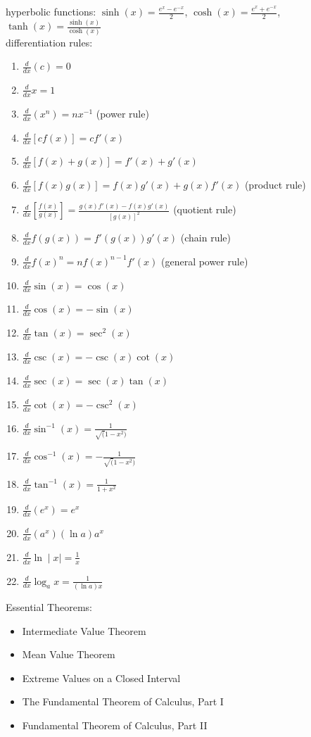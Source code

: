 \documentclass{article}
\begin{document}
hyperbolic functions: $\sinh(x) = \frac{e^x-e^{-x}}{2}$, $\cosh(x) = \frac{e^x+e^{-x}}{2}$, $\tanh(x) = \frac{\sinh(x)}{\cosh(x)}$\\

differentiation rules:
	\begin{enumerate}
		\item$\frac{d}{dx}(c) = 0$
		\item$\frac{d}{dx}x = 1$
		\item$\frac{d}{dx}(x^n) = nx^{-1}$ (power rule)
		\item$\frac{d}{dx}[cf(x)] = cf'(x)$
		\item$\frac{d}{dx}[f(x)+g(x)] = f'(x) + g'(x)$
		\item$\frac{d}{dx}[f(x)g(x)] = f(x)g'(x) + g(x)f'(x)$ (product rule)
		\item$\frac{d}{dx}[\frac{f(x)}{g(x)}] = \frac{g(x)f'(x) - f(x)g'(x)}{[g(x)]^2}$ (quotient rule)
		\item$\frac{d}{dx}f(g(x)) = f'(g(x))g'(x)$ (chain rule)
		\item$\frac{d}{dx}f(x)^n = nf(x)^{n-1}f'(x)$ (general power rule)
		\item$\frac{d}{dx}\sin(x) = \cos(x)$ 
		\item$\frac{d}{dx}\cos(x) = -\sin(x)$
		\item$\frac{d}{dx}\tan(x) = \sec^2(x)$
		\item$\frac{d}{dx}\csc(x) = -\csc(x)\cot(x)$
		\item$\frac{d}{dx}\sec(x) = \sec(x)\tan(x)$
		\item$\frac{d}{dx}\cot(x) = -\csc^2(x)$
		\item$\frac{d}{dx}\sin^{-1}(x) = \frac{1}{\sqrt(1 - x^2)}$
		\item$\frac{d}{dx}\cos^{-1}(x) = -\frac{1}{\sqrt(1 - x^2)}$
		\item$\frac{d}{dx}\tan^{-1}(x) = \frac{1}{1 + x^2}$
		\item$\frac{d}{dx}(e^x) = e^x$
		\item$\frac{d}{dx}(a^x) (\ln a)a^x$
		\item$\frac{d}{dx}\ln\mid x\mid = \frac{1}{x}$
		\item$\frac{d}{dx}\log_ax = \frac{1}{(\ln a)x}$
	\end{enumerate}

Essential Theorems:\\
	\begin{itemize}
		\item Intermediate Value Theorem
		\item Mean Value Theorem
		\item Extreme Values on a Closed Interval
		\item The Fundamental Theorem of Calculus, Part I
		\item Fundamental Theorem of Calculus, Part II
	\end{itemize}
\end{document}
